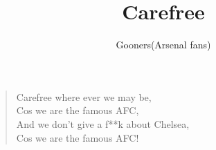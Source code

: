 \documentclass[a4paper,12pt]{article}
\title{Carefree}
\author{Gooners(Arsenal fans)}
\date{}
\begin{document}
	
	\maketitle
	
	\begin{verse}
		
		Carefree where ever we may be, \\
		Cos we are the famous AFC, \\
		And we don't give a f**k about Chelsea, \\
		Cos we are the famous AFC!
		
	\end{verse}
	
\end{document}
